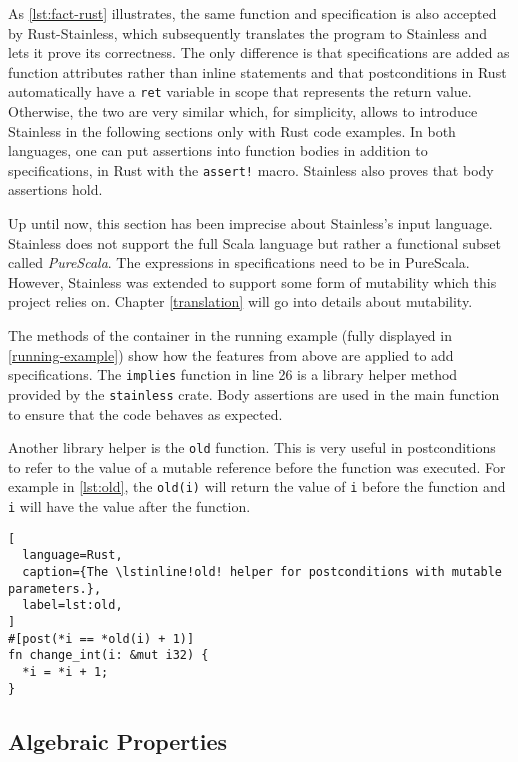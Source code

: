 As \autoref{lst:fact-rust} illustrates, the same function and specification is
also accepted by Rust-Stainless, which subsequently translates the program to
Stainless and lets it prove its correctness. The only difference is that
specifications are added as function attributes rather than inline statements
and that postconditions in Rust automatically have a \lstinline!ret! variable in
scope that represents the return value. Otherwise, the two are very similar
which, for simplicity, allows to introduce Stainless in the following sections
only with Rust code examples. In both languages, one can put assertions into
function bodies in addition to specifications, in Rust with the
\lstinline"assert!" macro. Stainless also proves that body assertions hold.

Up until now, this section has been imprecise about Stainless's input language.
Stainless does not support the full Scala language but rather a functional
subset called \emph{PureScala}. The expressions in specifications need to be in
PureScala. However, Stainless was extended to support some form of mutability
\cite{regb} which this project relies on. Chapter \ref{translation} will go into
details about mutability.

The methods of the container in the running example (fully displayed in
\autoref{running-example}) show how the features from above are applied to add
specifications. The \lstinline!implies! function in line 26 is a library helper
method provided by the \lstinline!stainless! crate. Body assertions are used in
the main function to ensure that the code behaves as expected.

Another library helper is the \lstinline!old! function. This is very useful in
postconditions to refer to the value of a mutable reference before the function
was executed. For example in \autoref{lst:old}, the \lstinline!old(i)! will
return the value of \lstinline!i! before the function and  \lstinline!i! will
have the value after the function.

\begin{lstlisting}[
  language=Rust,
  caption={The \lstinline!old! helper for postconditions with mutable parameters.},
  label=lst:old,
]
#[post(*i == *old(i) + 1)]
fn change_int(i: &mut i32) {
  *i = *i + 1;
}
\end{lstlisting}

\subsection{Algebraic Properties}
\label{laws-intro}

